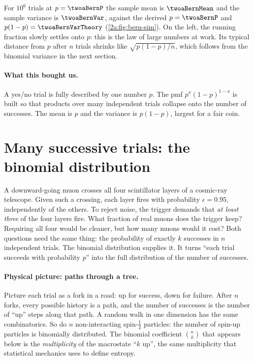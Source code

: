 For $10^6$ trials at $p=\twoaBernP$ the sample mean is $\twoaBernMean$ and the sample variance is $\twoaBernVar$, against the derived $p=\twoaBernP$ and $p(1-p)=\twoaBernVarTheory$ (\cref{2a:fig:bern-sim}). On the left, the running fraction slowly settles onto $p$: this is the law of large numbers at work. Its typical distance from $p$ after $n$ trials shrinks like $\sqrt{p(1-p)/n}$, which follows from the binomial variance in the next section.

\paragraph{What this bought us.}
A yes/no trial is fully described by one number $p$. The pmf $p^x(1-p)^{1-x}$ is built so that products over many independent trials collapse onto the number of successes. The mean is $p$ and the variance is $p(1-p)$, largest for a fair coin.

\section{Many successive trials: the binomial distribution}\label{2a:sec:binomial}

A downward-going muon crosses all four scintillator layers of a cosmic-ray telescope. Given such a crossing, each layer fires with probability $\epsilon=0.95$, independently of the others. To reject noise, the trigger demands that \emph{at least three} of the four layers fire. What fraction of real muons does the trigger keep? Requiring all four would be cleaner, but how many muons would it cost? Both questions need the same thing: the probability of exactly $k$ successes in $n$ independent trials. The binomial distribution supplies it. It turns ``each trial succeeds with probability $p$'' into the full distribution of the number of successes.

\paragraph{Physical picture: paths through a tree.}
Picture each trial as a fork in a road: up for success, down for failure. After $n$ forks, every possible history is a path, and the number of successes is the number of ``up'' steps along that path. A random walk in one dimension has the same combinatorics. So do $n$ non-interacting spin-$\tfrac12$ particles: the number of spin-up particles is binomially distributed. The binomial coefficient $\binom nk$ that appears below is the \emph{multiplicity} of the macrostate ``$k$ up'', the same multiplicity that statistical mechanics uses to define entropy.

